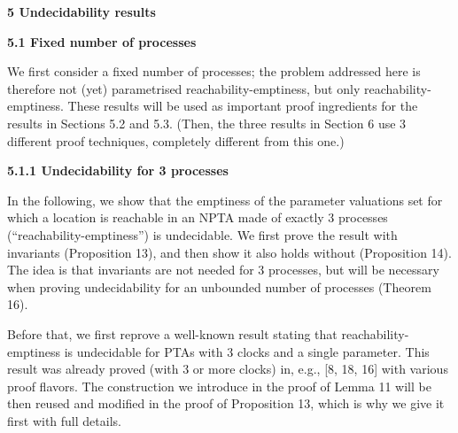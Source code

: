  
 
 


 
\par\medskip\noindent\textbf{5 Undecidability results}\par
 
 
\par\medskip\noindent\textbf{5.1 Fixed number of processes}\par
 
 
We first consider a fixed number of processes; the problem addressed here is therefore not (yet) parametrised reachability-emptiness, but only reachability-emptiness. These results will be used as important proof ingredients for the results in Sections 5.2 and 5.3. (Then, the three results in Section 6 use 3 different proof techniques, completely different from this one.)\par
 
 
 
\par\medskip\noindent\textbf{5.1.1 Undecidability for 3 processes}\par
 
 
In the following, we show that the emptiness of the parameter valuations set for which a location is reachable in an NPTA made of exactly 3 processes (“reachability-emptiness”) is undecidable. We first prove the result with invariants (Proposition 13), and then show it also holds without (Proposition 14). The idea is that invariants are not needed for 3 processes, but will be necessary when proving undecidability for an unbounded number of processes (Theorem 16).\par
 
 
 
Before that, we first reprove a well-known result stating that reachability-emptiness is undecidable for PTAs with 3 clocks and a single parameter. This result was already proved (with 3 or more clocks) in, e.g., [8, 18, 16] with various proof flavors. The construction we introduce in the proof of Lemma 11 will be then reused and modified in the proof of Proposition 13, which is why we give it first with full details.\par
 
